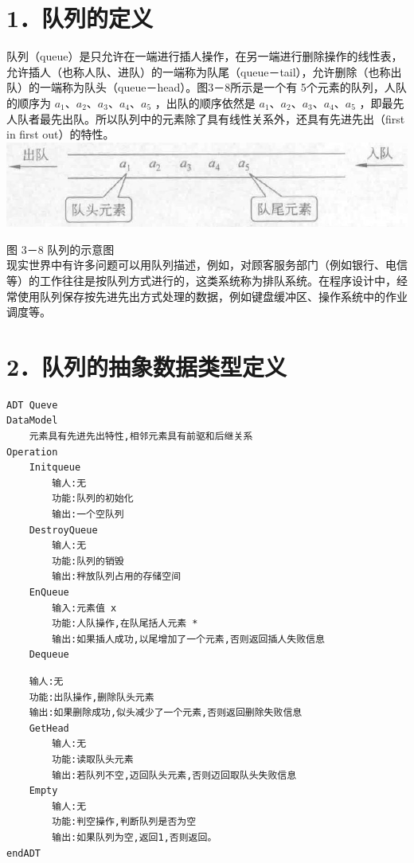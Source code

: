 \documentclass[10pt]{article}
\begin{document}
\section*{1．队列的定义}
队列（queue）是只允许在一端进行插人操作，在另一端进行删除操作的线性表，允许插人（也称人队、进队）的一端称为队尾（queue－tail），允许删除（也称出队）的一端称为队头（queue－head）。图3－8所示是一个有 5个元素的队列，人队的顺序为 $a_{1} 、 a_{2} 、 a_{3} 、 a_{4} 、 a_{5}$ ，出队的顺序依然是 $a_{1} 、 a_{2} 、 a_{3} 、 a_{4} 、 a_{5}$ ，即最先人队者最先出队。所以队列中的元素除了具有线性关系外，还具有先进先出（first in first out）的特性。\\
\includegraphics[max width=\textwidth, center]{2025_06_06_704745ea57b15b2333e5g-091}

图 3－8 队列的示意图\\
现实世界中有许多问题可以用队列描述，例如，对顾客服务部门（例如银行、电信等）的工作往往是按队列方式进行的，这类系统称为排队系统。在程序设计中，经常使用队列保存按先进先出方式处理的数据，例如键盘缓冲区、操作系统中的作业调度等。

\section*{2．队列的抽象数据类型定义}
\begin{verbatim}
ADT Queve
DataModel
    元素具有先进先出特性,相邻元素具有前驱和后继关系
Operation
    Initqueue
        输人:无
        功能:队列的初始化
        输出:一个空队列
    DestroyQueue
        输人:无
        功能:队列的销毁
        输出:秚放队列占用的存储空间
    EnQueue
        输入:元素值 x
        功能:人队操作,在队尾括人元素 *
        输出:如果插人成功,以尾增加了一个元素,否则返回插人失败信息
    Dequeue
\end{verbatim}

\begin{verbatim}
    输人:无
    功能:出队操作,删除队头元素
    输出:如果删除成功,似头减少了一个元素,否则返回删除失败信息
    GetHead
        输人:无
        功能:读取队头元素
        输出:若队列不空,迈回队头元素,否则迈回取队头失败信息
    Empty
        输人:无
        功能:判空操作,判断队列是否为空
        输出:如果队列为空,返回1,否则返回。
endADT
\end{verbatim}
\end{document}
